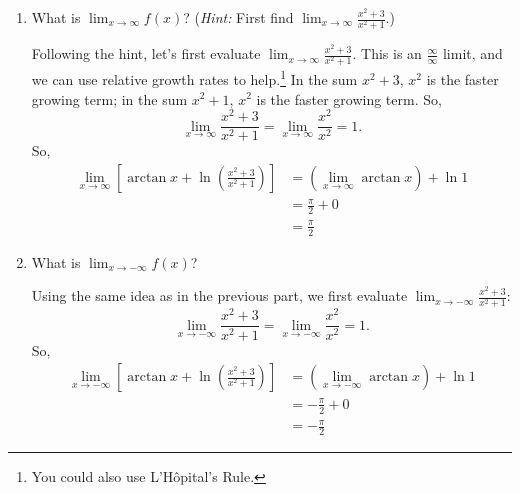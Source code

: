 \documentclass{article}
\begin{document}
\begin{enumerate}
\begin{enumerate}
  \item \label{arctan-ln-graph-limit-to-inf}
    \begin{problem}[\vfill]
      What is $\displaystyle \lim_{x \to \infty} f(x)$?  (\emph{Hint:}
      First find $\displaystyle \lim_{x \to \infty} \frac{x^2 + 3}{x^2 +
        1}$.)
    \end{problem}

    \begin{solution}
      Following the hint, let's first evaluate $\displaystyle \lim_{x \to
        \infty} \frac{x^2 + 3}{x^2 + 1}$.  This is an
      $\frac{\infty}{\infty}$ limit, and we can use relative growth rates
      to help.\footnote{You could also use L'H\^opital's Rule.}  In the
      sum $x^2 + 3$, $x^2$ is the faster growing term; in the sum $x^2 +
      1$, $x^2$ is the faster growing term.  So,
      \[ \lim_{x \to \infty} \frac{x^2 + 3}{x^2 + 1} = \lim_{x \to \infty}
      \frac{x^2}{x^2} = 1.\]
      So,
      \begin{align*}
        \lim_{x \to \infty} \left[ \arctan x + \ln \left( \frac{x^2 +
              3}{x^2 + 1} \right) \right] &= \left( \lim_{x \to \infty}
          \arctan x \right) + \ln 1 \\ 
        &= \frac{\pi}{2} + 0 \\
        &= \boxed{\frac{\pi}{2}}
      \end{align*}
    \end{solution}

  \item \label{arctan-ln-graph-limit-to-minus-inf}
    \begin{problem}[\vfill\newpage]
      What is $\displaystyle \lim_{x \to -\infty} f(x)$?
    \end{problem}

    \begin{solution}
      Using the same idea as in the previous part, we first evaluate
      $\displaystyle \lim_{x \to -\infty} \frac{x^2 + 3}{x^2 + 1}$:
      \[ \lim_{x \to -\infty} \frac{x^2 + 3}{x^2 + 1} = \lim_{x \to
        -\infty} \frac{x^2}{x^2} = 1.\]
      So,
      \begin{align*}
        \lim_{x \to -\infty} \left[ \arctan x + \ln \left( \frac{x^2 +
              3}{x^2 + 1} \right) \right] &= \left( \lim_{x \to -\infty}
          \arctan x \right) + \ln 1 \\ 
        &= - \frac{\pi}{2} + 0 \\
        &= \boxed{- \frac{\pi}{2}}
      \end{align*}
    \end{solution}


\end{enumerate}
\end{enumerate}
\end{document}
